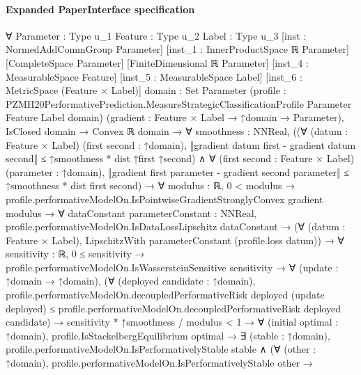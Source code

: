\documentclass[10pt]{article}
\begin{document}
\paragraph{Expanded PaperInterface specification}
\begin{ReviewVerbatim}
∀ {Parameter : Type u_1} {Feature : Type u_2} {Label : Type u_3} [inst : NormedAddCommGroup Parameter]
  [inst_1 : InnerProductSpace ℝ Parameter] [CompleteSpace Parameter] [FiniteDimensional ℝ Parameter]
  [inst_4 : MeasurableSpace Feature] [inst_5 : MeasurableSpace Label] [inst_6 : MetricSpace (Feature × Label)]
  {domain : Set Parameter}
  (profile : PZMH20PerformativePrediction.MeasureStrategicClassificationProfile Parameter Feature Label domain)
  (gradient : Feature × Label → ↑domain → Parameter),
  IsClosed domain →
    Convex ℝ domain →
      ∀ {smoothness : NNReal},
        ((∀ (datum : Feature × Label) (first second : ↑domain),
              ‖gradient datum first - gradient datum second‖ ≤ ↑smoothness * dist ↑first ↑second) ∧
            ∀ (first second : Feature × Label) (parameter : ↑domain),
              ‖gradient first parameter - gradient second parameter‖ ≤ ↑smoothness * dist first second) →
          ∀ {modulus : ℝ},
            0 < modulus →
              profile.performativeModelOn.IsPointwiseGradientStronglyConvex gradient modulus →
                ∀ {dataConstant parameterConstant : NNReal},
                  profile.performativeModelOn.IsDataLossLipschitz dataConstant →
                    (∀ (datum : Feature × Label), LipschitzWith parameterConstant (profile.loss datum)) →
                      ∀ {sensitivity : ℝ},
                        0 ≤ sensitivity →
                          profile.performativeModelOn.IsWassersteinSensitive sensitivity →
                            ∀ (update : ↑domain → ↑domain),
                              (∀ (deployed candidate : ↑domain),
                                  profile.performativeModelOn.decoupledPerformativeRisk deployed (update deployed) ≤
                                    profile.performativeModelOn.decoupledPerformativeRisk deployed candidate) →
                                sensitivity * ↑smoothness / modulus < 1 →
                                  ∀ (initial optimal : ↑domain),
                                    profile.IsStackelbergEquilibrium optimal →
                                      ∃ (stable : ↑domain),
                                        profile.performativeModelOn.IsPerformativelyStable stable ∧
                                          (∀ (other : ↑domain),
                                              profile.performativeModelOn.IsPerformativelyStable other →

\end{ReviewVerbatim}
\end{document}

